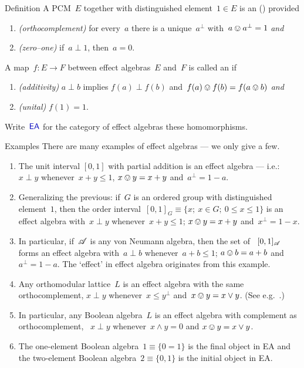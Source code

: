 \documentclass[b]{subfiles}
\begin{document}
\begin{parsec}%
\begin{point}[dfn-ea]{Definition}%
A PCM~$E$ together with distinguished element~$1 \in E$
is an  () \cite{ea}
    provided
\begin{enumerate}
\item
    \emph{(orthocomplement)}
    for every~$a$
    there is a unique~$a^\perp$
   with~$a \ovee a^\perp = 1$ \emph{and}
\item
    \emph{(zero--one)}
    if~$a \perp 1$, then~$a = 0$.
\end{enumerate}
A map~$f\colon E \to F$
between effect algebras~$E$ and~$F$
is called an 
if
\begin{enumerate}
    \item \emph{(additivity)}
    $a \perp b$ implies $f(a) \perp f(b)$ and~$f(a)\ovee f(b) = f(a\ovee b)$
        \emph{and}
    \item \emph{(unital)}
    $f(1) = 1$.
\end{enumerate}
Write~$\Define{\textsf{EA}}$ for the category
    of effect algebras these homomorphisms.
\end{point}
\begin{point}{Examples}%
There are many examples of effect algebras
    --- we only give a few.
\begin{enumerate}
\item
The unit interval
$[0,1]$ with partial addition is an effect algebra ---
i.e.:~$x \perp y$
        whenever~$x +y \leq 1$, $x \ovee y = x + y$
        and~$a^\perp = 1-a$.
\item
Generalizing the previous:
if~$G$ is an ordered group
with distinguished element~$1$,
then the order interval~$[0,1]_G \equiv \{x;\ x\in G;\ 0 \leq x\leq 1\}$
is an effect algebra
with~$x \perp y$ whenever~$x +y \leq 1$;
$x \ovee y = x + y$ and~$x^\perp = 1-x$.
\item
In particular,
    if~$\mathscr{A}$ is any von Neumann algebra,
    then the set of ~$[0,1]_{\mathscr{A}}$
    forms an effect algebra
    with~$a \perp b$ whenever~$a +b \leq 1$;
    $a \ovee b = a + b$ and~$a^\perp = 1-a$.
The `effect' in effect algebra originates from this example.
\item
Any orthomodular lattice~$L$
    is an effect algebra
    with the same orthocomplement,
    $x \perp y$ whenever~$x \leq y^\perp$
    and~$x \ovee y = x \vee y$.  (See e.g.~\cite[Prop.~27]{basmsc}.)
\item
In particular,
    any Boolean algebra~$L$
    is an effect algebra
    with complement as orthocomplement,
    ~$x \perp y$ whenever~$x \wedge y = 0$ and
    $x \ovee y = x \vee y $.
\item
The one-element Boolean algebra~$1 \equiv \{0=1\}$
    is the final object in \textsf{EA}
    and the two-element Boolean algebra~$2 \equiv \{0,1\}$
    is the initial object in \textsf{EA}.
\end{enumerate}
\end{point}


\end{parsec}
\end{document}
